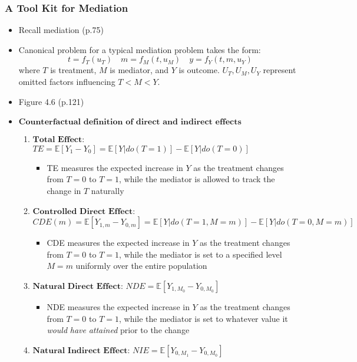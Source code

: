 \documentclass[]{article}
\providecommand{\tightlist}{%
  \setlength{\itemsep}{0pt}\setlength{\parskip}{0pt}}
\begin{document}
\subsubsection{A Tool Kit for Mediation}\label{a-tool-kit-for-mediation}

\begin{itemize}
\item
  Recall mediation (p.75)
\item
  Canonical problem for a typical mediation problem takes the form:
  \[t = f_T(u_T) \quad m = f_M(t, u_M) \quad y = f_Y(t, m, u_Y)\] where
  \(T\) is treatment, \(M\) is mediator, and \(Y\) is outcome.
  \(U_T, U_M, U_Y\) represent omitted factors influencing \(T<M<Y\).
\item
  Figure 4.6 (p.121)
\item
  \(\textbf{Counterfactual definition of direct and indirect effects}\)

  \begin{enumerate}
  \def\labelenumi{\alph{enumi})}
  \item
    \(\textbf{Total Effect}\):
    \(TE = \mathbb{E}[Y_1 - Y_0] = \mathbb{E}[Y|do(T=1)] - \mathbb{E}[Y|do(T = 0)]\)

    \begin{itemize}
    \tightlist
    \item
      TE measures the expected increase in \(Y\) as the treatment
      changes from \(T = 0\) to \(T = 1\), while the mediator is allowed
      to track the change in \(T\) naturally
    \end{itemize}
  \item
    \(\textbf{Controlled Direct Effect}\):
    \(CDE(m) = \mathbb{E}[Y_{1,m} - Y_{0,m}] = \mathbb{E}[Y|do(T = 1, M = m)] - \mathbb{E}[Y|do(T = 0, M = m)]\)

    \begin{itemize}
    \tightlist
    \item
      CDE measures the expected increase in \(Y\) as the treatment
      changes from \(T = 0\) to \(T = 1\), while the mediator is set to
      a specified level \(M = m\) uniformly over the entire population
    \end{itemize}
  \item
    \(\textbf{Natural Direct Effect}\):
    \(NDE = \mathbb{E}[Y_{1, M_0} - Y_{0, M_0}]\)

    \begin{itemize}
    \tightlist
    \item
      NDE measures the expected increase in \(Y\) as the treatment
      changes from \(T = 0\) to \(T = 1\), while the mediator is set to
      whatever value it \emph{would} \emph{have} \emph{attained} prior
      to the change
    \end{itemize}
  \item
    \(\textbf{Natural Indirect Effect}\):
    \(NIE = \mathbb{E}[Y_{0, M_1} - Y_{0, M_0}]\)


\end{enumerate}
\end{itemize}
\end{document}

